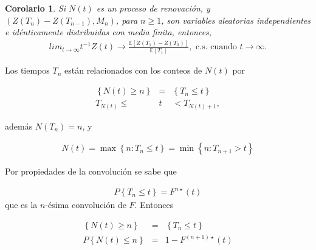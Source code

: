 \documentclass{article}
\newtheorem{Coro}{Corolario}[section]
\newcommand{\esp}{\mathbb{E}}
\numberwithin{equation}{section}
\begin{document}
\begin{Coro}
Si $N\left(t\right)$ es un proceso de renovaci\'on, y $\left(Z\left(T_{n}\right)-Z\left(T_{n-1}\right),M_{n}\right)$, para $n\geq1$, son variables aleatorias independientes e id\'enticamente distribuidas con media finita, entonces,
\begin{eqnarray}
lim_{t\rightarrow\infty}t^{-1}Z\left(t\right)\rightarrow\frac{\esp\left[Z\left(T_{1}\right)-Z\left(T_{0}\right)\right]}{\esp\left[T_{1}\right]},\textrm{ c.s. cuando  }t\rightarrow\infty.
\end{eqnarray}
\end{Coro}



%
%

Los tiempos $T_{n}$ est\'an relacionados con los conteos de $N\left(t\right)$ por

\begin{eqnarray*}
\left\{N\left(t\right)\geq n\right\}&=&\left\{T_{n}\leq t\right\}\\
T_{N\left(t\right)}\leq &t&<T_{N\left(t\right)+1},
\end{eqnarray*}

adem\'as $N\left(T_{n}\right)=n$, y 

\begin{eqnarray*}
N\left(t\right)=\max\left\{n:T_{n}\leq t\right\}=\min\left\{n:T_{n+1}>t\right\}
\end{eqnarray*}

Por propiedades de la convoluci\'on se sabe que

\begin{eqnarray*}
P\left\{T_{n}\leq t\right\}=F^{n\star}\left(t\right)
\end{eqnarray*}
que es la $n$-\'esima convoluci\'on de $F$. Entonces 

\begin{eqnarray*}
\left\{N\left(t\right)\geq n\right\}&=&\left\{T_{n}\leq t\right\}\\
P\left\{N\left(t\right)\leq n\right\}&=&1-F^{\left(n+1\right)\star}\left(t\right)
\end{eqnarray*}
\end{document}
